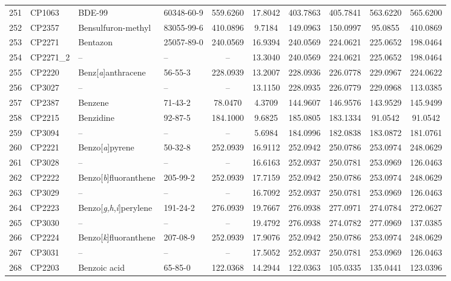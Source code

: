 \begin{longtable}{clllcccccc}
251 & CP1063 & BDE-99 & 60348-60-9 & 559.6260 & 17.8042 & 403.7863 & 405.7841 & 563.6220 & 565.6200 \\ 
252 & CP2357 & Bensulfuron-methyl & 83055-99-6 & 410.0896 & 9.7184 & 149.0963 & 150.0997 & 95.0855 & 410.0869 \\ 
253 & CP2271 & Bentazon & 25057-89-0 & 240.0569 & 16.9394 & 240.0569 & 224.0621 & 225.0652 & 198.0464 \\ 
254 & CP2271\_2 & – & – & – & 13.3040 & 240.0569 & 224.0621 & 225.0652 & 198.0464 \\ 
255 & CP2220 & Benz[\textit{a}]anthracene & 56-55-3 & 228.0939 & 13.2007 & 228.0936 & 226.0778 & 229.0967 & 224.0622 \\ 
256 & CP3027 & – & – & – & 13.1150 & 228.0935 & 226.0779 & 229.0968 & 113.0385 \\ 
257 & CP2387 & Benzene\smash{\textsuperscript{\textdagger}} & 71-43-2 & 78.0470 & 4.3709 & 144.9607 & 146.9576 & 143.9529 & 145.9499 \\ 
258 & CP2215 & Benzidine\smash{\textsuperscript{\textdaggerdbl}} & 92-87-5 & 184.1000 & 9.6825 & 185.0805 & 183.1334 & 91.0542 & 91.0542 \\ 
259 & CP3094 & – & – & – & 5.6984 & 184.0996 & 182.0838 & 183.0872 & 181.0761 \\ 
260 & CP2221 & Benzo[\textit{a}]pyrene & 50-32-8 & 252.0939 & 16.9112 & 252.0942 & 250.0786 & 253.0974 & 248.0629 \\ 
261 & CP3028 & – & – & – & 16.6163 & 252.0937 & 250.0781 & 253.0969 & 126.0463 \\ 
262 & CP2222 & Benzo[\textit{b}]fluoranthene & 205-99-2 & 252.0939 & 17.7159 & 252.0942 & 250.0786 & 253.0974 & 248.0629 \\ 
263 & CP3029 & – & – & – & 16.7092 & 252.0937 & 250.0781 & 253.0969 & 126.0463 \\ 
264 & CP2223 & Benzo[\textit{g},\textit{h},\textit{i}]perylene & 191-24-2 & 276.0939 & 19.7667 & 276.0938 & 277.0971 & 274.0784 & 272.0627 \\ 
265 & CP3030 & – & – & – & 19.4792 & 276.0938 & 274.0782 & 277.0969 & 137.0385 \\ 
266 & CP2224 & Benzo[\textit{k}]fluoranthene & 207-08-9 & 252.0939 & 17.9076 & 252.0942 & 250.0786 & 253.0974 & 248.0629 \\ 
267 & CP3031 & – & – & – & 17.5052 & 252.0937 & 250.0781 & 253.0969 & 126.0463 \\ 
268 & CP2203 & Benzoic acid & 65-85-0 & 122.0368 & 14.2944 & 122.0363 & 105.0335 & 135.0441 & 123.0396 \\ 

\end{longtable}
